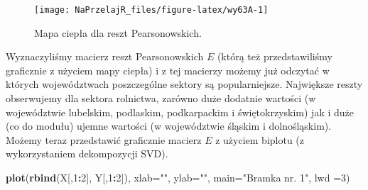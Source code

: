 \documentclass[polish,]{book}
\newenvironment{Shaded}{\begin{snugshade}}{\end{snugshade}}
\newcommand{\AlertTok}[1]{\textcolor[rgb]{0.94,0.16,0.16}{#1}}
\newcommand{\CommentTok}[1]{\textcolor[rgb]{0.56,0.35,0.01}{\textit{#1}}}
\newcommand{\DataTypeTok}[1]{\textcolor[rgb]{0.13,0.29,0.53}{#1}}
\newcommand{\DecValTok}[1]{\textcolor[rgb]{0.00,0.00,0.81}{#1}}
\newcommand{\KeywordTok}[1]{\textcolor[rgb]{0.13,0.29,0.53}{\textbf{#1}}}
\newcommand{\NormalTok}[1]{#1}
\newcommand{\OperatorTok}[1]{\textcolor[rgb]{0.81,0.36,0.00}{\textbf{#1}}}
\newcommand{\StringTok}[1]{\textcolor[rgb]{0.31,0.60,0.02}{#1}}
\begin{document}
\begin{figure}[h]

{\centering \texttt{[image: NaPrzelajR\_files/figure-latex/wy63A-1]} 

}

\caption{Mapa ciepła dla reszt Pearsonowskich.}\label{fig:wy63A}
\end{figure}

Wyznaczyliśmy macierz reszt Pearsonowskich \(E\) (którą też przedstawiliśmy graficznie z użyciem mapy ciepła) i z tej macierzy możemy już odczytać w których
województwach poszczególne sektory są popularniejsze. Największe reszty obserwujemy dla sektora rolnictwa, zarówno duże dodatnie wartości (w województwie lubelskim, podlaskim, podkarpackim i świętokrzyskim) jak i duże (co do modułu) ujemne wartości (w województwie śląskim i dolnośląskim).
Możemy teraz przedstawić graficznie macierz \(E\) z użyciem biplotu (z wykorzystaniem dekompozycji SVD).

\begin{Shaded}
\end{Shaded}

\begin{Shaded}
\begin{Highlighting}[]
\KeywordTok{plot}\NormalTok{(}\KeywordTok{rbind}\NormalTok{(X[,}\DecValTok{1}\OperatorTok{:}\DecValTok{2}\NormalTok{], Y[,}\DecValTok{1}\OperatorTok{:}\DecValTok{2}\NormalTok{]), }\DataTypeTok{xlab=}\StringTok{""}\NormalTok{, }\DataTypeTok{ylab=}\StringTok{""}\NormalTok{, }\DataTypeTok{main=}\StringTok{"Bramka nr. 1"}\NormalTok{, lwd}
\NormalTok{=}\DecValTok{3}\NormalTok{)}
\end{Highlighting}
\end{Shaded}
\end{document}
